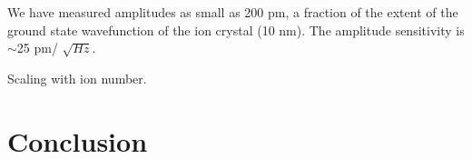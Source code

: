 \documentclass[aps,prl,twocolumn,groupedaddress]{revtex4-1}
\begin{document}
We have measured amplitudes as small as 200 pm, a fraction of the extent of the ground state wavefunction of the ion crystal (10 nm). The amplitude sensitivity is $\sim$25 pm/ $ \sqrt{Hz}$.

Scaling with ion number.

\section{Conclusion}

\subsection{}
\subsubsection{}





%


\nocite{*}
\end{document}
